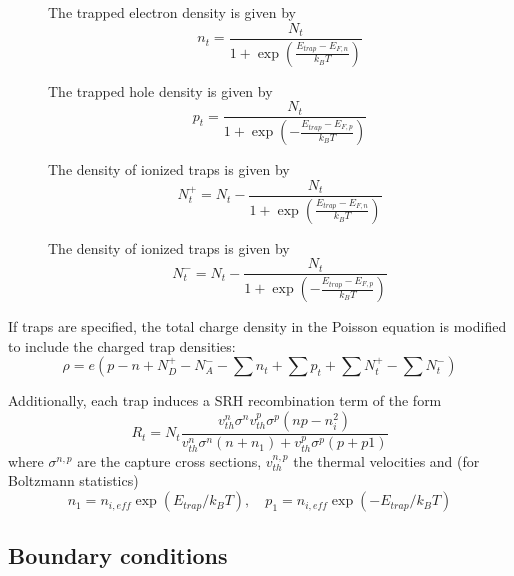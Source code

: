 \begin{description}
\item[] The trapped electron density is given by
\begin{equation}
n_t = \frac{N_t}{1 + \exp(\frac{E_{trap} - E_{F,n}}{k_BT})}
\end{equation}
\item[] The trapped hole density is given by
\begin{equation}
p_t = \frac{N_t}{1 + \exp(-\frac{E_{trap} - E_{F,p}}{k_BT})}
\end{equation}
\item[] The density of ionized traps is given by
\begin{equation}
N^+_t = N_t - \frac{N_t}{1 + \exp(\frac{E_{trap} - E_{F,n}}{k_BT})}
\end{equation}
\item[] The density of ionized traps is given by
\begin{equation}
N^-_t = N_t - \frac{N_t}{1 + \exp(-\frac{E_{trap} - E_{F,p}}{k_BT})}
\end{equation}
\end{description}

If traps are specified, the total charge density in the Poisson equation is modified to include the charged trap densities:
\begin{equation}
\rho = e\left(p - n + N^+_D - N^-_A - \sum n_t + \sum p_t + \sum N^+_t - \sum N^-_t \right)
\end{equation}

Additionally, each trap induces a SRH recombination term of the form
\begin{equation}
R_t = N_t \frac{v_{th}^n\sigma^nv_{th}^p\sigma^p(np -n_i^2)}{v_{th}^n\sigma^n(n+n_1) + v_{th}^p\sigma^p(p+p1)}
\end{equation}
where $\sigma^{n,p}$ are the capture cross sections, $v_{th}^{n,p}$ the thermal velocities and (for Boltzmann statistics)
\begin{equation}
n_1 = n_{i,eff} \exp(E_{trap}/k_BT),\quad p_1 = n_{i,eff} \exp(-E_{trap}/k_BT)
\end{equation}




\subsection{Boundary conditions}


